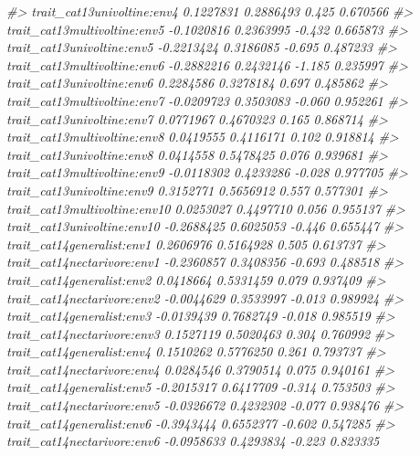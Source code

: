\documentclass[
]{article}
\newenvironment{Shaded}{\begin{snugshade}}{\end{snugshade}}
\newcommand{\CommentTok}[1]{\textcolor[rgb]{0.56,0.35,0.01}{\textit{#1}}}
\begin{document}
\begin{Shaded}
\begin{Highlighting}[]
\CommentTok{\#\textgreater{} trait\_cat13univoltine:env4     0.1227831  0.2886493   0.425 0.670566    }
\CommentTok{\#\textgreater{} trait\_cat13multivoltine:env5  {-}0.1020816  0.2363995  {-}0.432 0.665873    }
\CommentTok{\#\textgreater{} trait\_cat13univoltine:env5    {-}0.2213424  0.3186085  {-}0.695 0.487233    }
\CommentTok{\#\textgreater{} trait\_cat13multivoltine:env6  {-}0.2882216  0.2432146  {-}1.185 0.235997    }
\CommentTok{\#\textgreater{} trait\_cat13univoltine:env6     0.2284586  0.3278184   0.697 0.485862    }
\CommentTok{\#\textgreater{} trait\_cat13multivoltine:env7  {-}0.0209723  0.3503083  {-}0.060 0.952261    }
\CommentTok{\#\textgreater{} trait\_cat13univoltine:env7     0.0771967  0.4670323   0.165 0.868714    }
\CommentTok{\#\textgreater{} trait\_cat13multivoltine:env8   0.0419555  0.4116171   0.102 0.918814    }
\CommentTok{\#\textgreater{} trait\_cat13univoltine:env8     0.0414558  0.5478425   0.076 0.939681    }
\CommentTok{\#\textgreater{} trait\_cat13multivoltine:env9  {-}0.0118302  0.4233286  {-}0.028 0.977705    }
\CommentTok{\#\textgreater{} trait\_cat13univoltine:env9     0.3152771  0.5656912   0.557 0.577301    }
\CommentTok{\#\textgreater{} trait\_cat13multivoltine:env10  0.0253027  0.4497710   0.056 0.955137    }
\CommentTok{\#\textgreater{} trait\_cat13univoltine:env10   {-}0.2688425  0.6025053  {-}0.446 0.655447    }
\CommentTok{\#\textgreater{} trait\_cat14generalist:env1     0.2606976  0.5164928   0.505 0.613737    }
\CommentTok{\#\textgreater{} trait\_cat14nectarivore:env1   {-}0.2360857  0.3408356  {-}0.693 0.488518    }
\CommentTok{\#\textgreater{} trait\_cat14generalist:env2     0.0418664  0.5331459   0.079 0.937409    }
\CommentTok{\#\textgreater{} trait\_cat14nectarivore:env2   {-}0.0044629  0.3533997  {-}0.013 0.989924    }
\CommentTok{\#\textgreater{} trait\_cat14generalist:env3    {-}0.0139439  0.7682749  {-}0.018 0.985519    }
\CommentTok{\#\textgreater{} trait\_cat14nectarivore:env3    0.1527119  0.5020463   0.304 0.760992    }
\CommentTok{\#\textgreater{} trait\_cat14generalist:env4     0.1510262  0.5776250   0.261 0.793737    }
\CommentTok{\#\textgreater{} trait\_cat14nectarivore:env4    0.0284546  0.3790514   0.075 0.940161    }
\CommentTok{\#\textgreater{} trait\_cat14generalist:env5    {-}0.2015317  0.6417709  {-}0.314 0.753503    }
\CommentTok{\#\textgreater{} trait\_cat14nectarivore:env5   {-}0.0326672  0.4232302  {-}0.077 0.938476    }
\CommentTok{\#\textgreater{} trait\_cat14generalist:env6    {-}0.3943444  0.6552377  {-}0.602 0.547285    }
\CommentTok{\#\textgreater{} trait\_cat14nectarivore:env6   {-}0.0958633  0.4293834  {-}0.223 0.823335    }

\end{Highlighting}
\end{Shaded}
\end{document}
